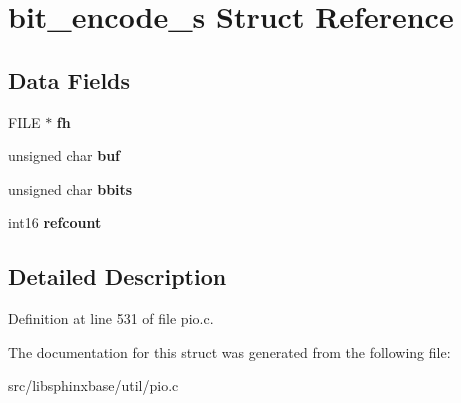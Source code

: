 \section{bit\-\_\-encode\-\_\-s Struct Reference}
\label{structbit__encode__s}
\subsection*{Data Fields}
\begin{DoxyCompactItemize}
\item 
F\-I\-L\-E $\ast$ {\bfseries fh}\label{structbit__encode__s_af0c1de2333ec798aa832e762f4ee9887}

\item 
unsigned char {\bfseries buf}\label{structbit__encode__s_af068f9ee3624aed0b0c8720d579d2c7b}

\item 
unsigned char {\bfseries bbits}\label{structbit__encode__s_a69d53d4800481f63b0c2b990472323f8}

\item 
int16 {\bfseries refcount}\label{structbit__encode__s_af2862417e58a196618593631fc5e9833}

\end{DoxyCompactItemize}


\subsection{Detailed Description}


Definition at line 531 of file pio.\-c.



The documentation for this struct was generated from the following file\-:\begin{DoxyCompactItemize}
\item 
src/libsphinxbase/util/pio.\-c\end{DoxyCompactItemize}
